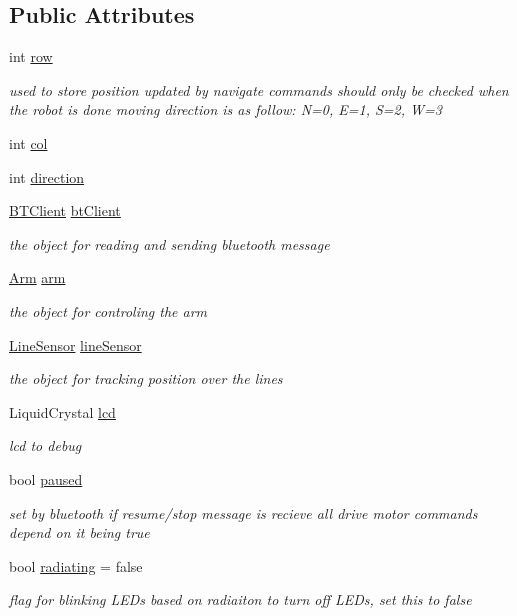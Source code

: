 \subsection*{Public Attributes}
\begin{DoxyCompactItemize}
\item 
int \hyperlink{classRobot_a35ce5c416a079fcf6b943843ec151d63}{row}
\begin{DoxyCompactList}\small\item\em used to store position updated by navigate commands should only be checked when the robot is done moving direction is as follow\-: N=0, E=1, S=2, W=3 \end{DoxyCompactList}\item 
int \hyperlink{classRobot_a2e08d53491bb82defe2e28ee9ce1d096}{col}
\item 
int \hyperlink{classRobot_ac25b4dfc2e9e5aa86ec5684d075d32b8}{direction}
\item 
\hyperlink{classBTClient}{B\-T\-Client} \hyperlink{classRobot_a9da91e6d551ed02038e935b3c755cc75}{bt\-Client}
\begin{DoxyCompactList}\small\item\em the object for reading and sending bluetooth message \end{DoxyCompactList}\item 
\hyperlink{classArm}{Arm} \hyperlink{classRobot_a444673862cbe384992aceb066282b500}{arm}
\begin{DoxyCompactList}\small\item\em the object for controling the arm \end{DoxyCompactList}\item 
\hyperlink{classLineSensor}{Line\-Sensor} \hyperlink{classRobot_abdc300045bea9a31013b25682629752d}{line\-Sensor}
\begin{DoxyCompactList}\small\item\em the object for tracking position over the lines \end{DoxyCompactList}\item 
Liquid\-Crystal \hyperlink{classRobot_aa2182958e636a5b3e0383643a48ca6f8}{lcd}
\begin{DoxyCompactList}\small\item\em lcd to debug \end{DoxyCompactList}\item 
bool \hyperlink{classRobot_a6a1fae6e6ee0a3298b9e60d3f50ad12a}{paused}
\begin{DoxyCompactList}\small\item\em set by bluetooth if resume/stop message is recieve all drive motor commands depend on it being true \end{DoxyCompactList}\item 
bool \hyperlink{classRobot_a77f62d85ab1cf34e79c2a3acd470a4ce}{radiating} = false
\begin{DoxyCompactList}\small\item\em flag for blinking L\-E\-Ds based on radiaiton to turn off L\-E\-Ds, set this to false \end{DoxyCompactList}\end{DoxyCompactItemize}
